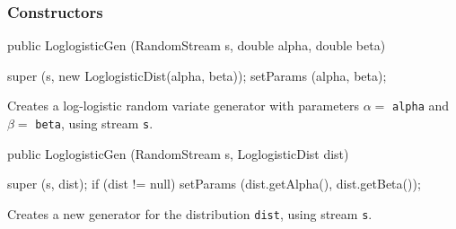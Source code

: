 \subsubsection* {Constructors}
\begin{code}

   public LoglogisticGen (RandomStream s, double alpha, double beta) \begin{hide} {
      super (s, new LoglogisticDist(alpha, beta));
      setParams (alpha, beta);
   }\end{hide}
\end{code} 
\begin{tabb} Creates a log-logistic random variate generator with parameters
  $\alpha =$ \texttt{alpha} and $\beta =$ \texttt{beta}, using stream \texttt{s}. 
\end{tabb}
\begin{code}

   public LoglogisticGen (RandomStream s, LoglogisticDist dist) \begin{hide} {
      super (s, dist);
      if (dist != null)
         setParams (dist.getAlpha(), dist.getBeta());
   }\end{hide}
\end{code}
  \begin{tabb} Creates a new generator for the distribution \texttt{dist},
     using stream \texttt{s}.
  \end{tabb}


